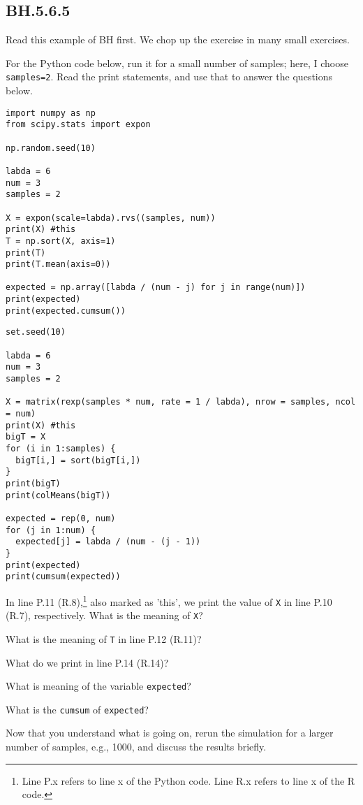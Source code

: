\subsection{BH.5.6.5}
Read this example of BH first.
We chop up the exercise in many small exercises.


For the Python code below, run it for a small number of samples; here, I choose \texttt{samples=2}. Read the print statements, and use that to answer the questions below.

\begin{verbatim}
import numpy as np
from scipy.stats import expon

np.random.seed(10)

labda = 6
num = 3
samples = 2

X = expon(scale=labda).rvs((samples, num))
print(X) #this
T = np.sort(X, axis=1)
print(T)
print(T.mean(axis=0))

expected = np.array([labda / (num - j) for j in range(num)])
print(expected)
print(expected.cumsum())
\end{verbatim}


\begin{verbatim}
set.seed(10)

labda = 6
num = 3
samples = 2

X = matrix(rexp(samples * num, rate = 1 / labda), nrow = samples, ncol = num)
print(X) #this
bigT = X
for (i in 1:samples) {
  bigT[i,] = sort(bigT[i,])
}
print(bigT)
print(colMeans(bigT))

expected = rep(0, num)
for (j in 1:num) {
  expected[j] = labda / (num - (j - 1))
}
print(expected)
print(cumsum(expected))
\end{verbatim}



\begin{exercise}
In line P.11 (R.8),\footnote{Line P.x refers to line x of the Python code.
  Line R.x refers to line x of the R code.}
also marked as 'this', we print the value of \texttt{X} in line P.10 (R.7), respectively.
What is the meaning of \texttt{X}?
\end{exercise}

\begin{exercise}
What is the meaning of \texttt{T} in line P.12 (R.11)?
\end{exercise}


\begin{exercise}
What do we print in line P.14 (R.14)?
\end{exercise}

\begin{exercise}
What is meaning of the variable \texttt{expected}?
\end{exercise}

\begin{exercise}
 What is the \texttt{cumsum} of \texttt{expected}?
\end{exercise}

\begin{exercise}
 Now that you understand what is going on, rerun the simulation for a larger number of samples, e.g., 1000, and discuss the results briefly.
\end{exercise}
